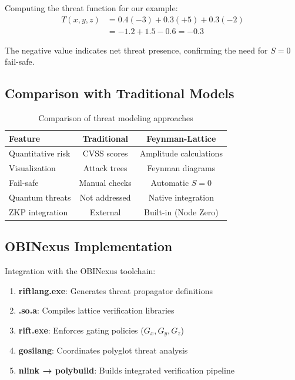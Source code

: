 \documentclass[11pt,a4paper]{article}
\begin{document}
Computing the threat function for our example:
\begin{align}
T(x,y,z) &= 0.4(-3) + 0.3(+5) + 0.3(-2) \\
&= -1.2 + 1.5 - 0.6 = -0.3
\end{align}

The negative value indicates net threat presence, confirming the need for $S = 0$ fail-safe.

\subsection{Comparison with Traditional Models}

\begin{table}[h]
\centering
\begin{tabular}{l|c|c}
\hline
\textbf{Feature} & \textbf{Traditional} & \textbf{Feynman-Lattice} \\
\hline
Quantitative risk & CVSS scores & Amplitude calculations \\
Visualization & Attack trees & Feynman diagrams \\
Fail-safe & Manual checks & Automatic $S = 0$ \\
Quantum threats & Not addressed & Native integration \\
ZKP integration & External & Built-in (Node Zero) \\
\hline
\end{tabular}
\caption{Comparison of threat modeling approaches}
\end{table}

\subsection{OBINexus Implementation}

Integration with the OBINexus toolchain:
\begin{enumerate}
    \item \textbf{riftlang.exe}: Generates threat propagator definitions
    \item \textbf{.so.a}: Compiles lattice verification libraries
    \item \textbf{rift.exe}: Enforces gating policies ($G_x, G_y, G_z$)
    \item \textbf{gosilang}: Coordinates polyglot threat analysis
    \item \textbf{nlink → polybuild}: Builds integrated verification pipeline
\end{enumerate}
\end{document}
